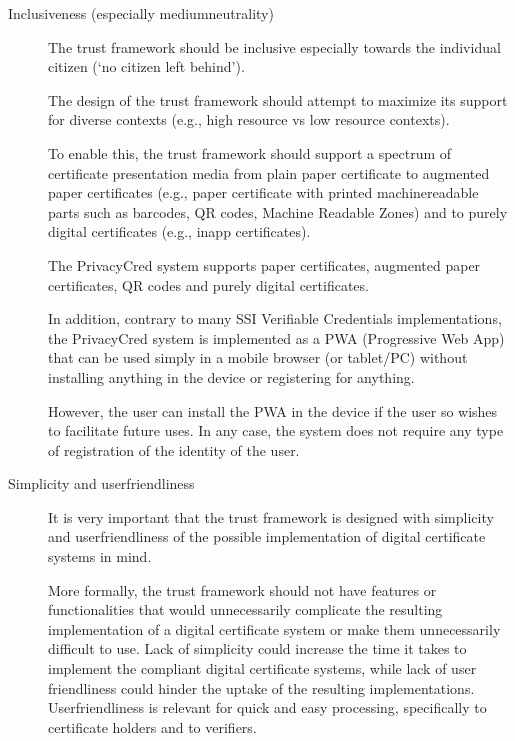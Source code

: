 \documentclass[a4paper,12pt,english]{sphinxhowto}
\begin{document}
\begin{description}
\item[{Inclusiveness (especially medium\sphinxhyphen{}neutrality)}] \leavevmode
\sphinxAtStartPar
The trust framework should be inclusive especially towards the individual citizen (‘no citizen left behind’).

\sphinxAtStartPar
The design of the trust framework should attempt to maximize its support for diverse contexts (e.g., high resource vs low resource contexts).

\sphinxAtStartPar
To enable this, the trust framework should support a spectrum of certificate presentation media from plain paper certificate to augmented paper certificates (e.g., paper certificate with printed machinereadable parts such as barcodes, QR codes, Machine Readable Zones) and to purely digital certificates (e.g., in\sphinxhyphen{}app certificates).

\sphinxAtStartPar
The PrivacyCred system supports paper certificates, augmented paper certificates, QR codes and purely digital certificates.

\sphinxAtStartPar
In addition, contrary to many SSI Verifiable Credentials implementations, the PrivacyCred system is implemented as a PWA (Progressive Web App) that can be used simply in a mobile browser (or tablet/PC) without installing anything in the device or registering for anything.

\sphinxAtStartPar
However, the user can install the PWA in the device if the user so wishes to facilitate future uses. In any case, the system does not require any type of registration of the identity of the user.

\item[{Simplicity and user\sphinxhyphen{}friendliness}] \leavevmode
\sphinxAtStartPar
It is very important that the trust framework is designed with simplicity and user\sphinxhyphen{}friendliness of the possible implementation of digital certificate systems in mind.

\sphinxAtStartPar
More formally, the trust framework should not have features or functionalities that would unnecessarily complicate the resulting implementation of a digital certificate system or make them unnecessarily difficult to use. Lack of simplicity could increase the time it takes to implement the compliant digital certificate systems, while lack of user friendliness could hinder the uptake of the resulting implementations. User\sphinxhyphen{}friendliness is relevant for quick and easy processing, specifically to certificate holders and to verifiers.


\end{description}
\end{document}
